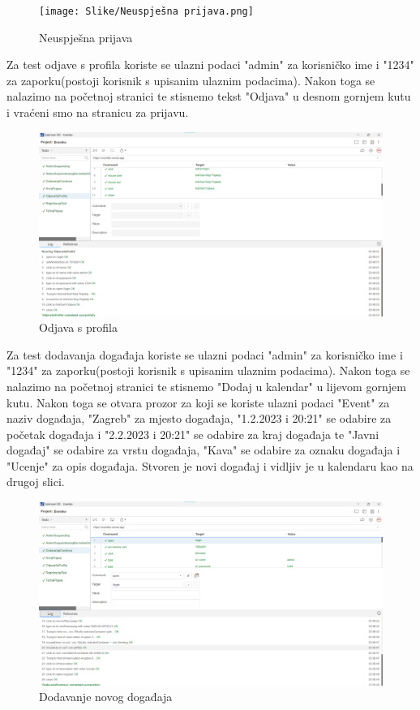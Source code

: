  			\begin{figure}[H]
 				\texttt{[image: Slike/Neuspješna prijava.png]}
 				\caption{Neuspješna prijava}
 			\end{figure}
 		
 			\indent Za test odjave s profila koriste se ulazni podaci "admin" za korisničko ime i "1234" za zaporku(postoji korisnik s upisanim ulaznim podacima). Nakon toga se nalazimo na početnoj stranici te stisnemo tekst "Odjava" u desnom gornjem kutu i vraćeni smo na stranicu za prijavu.
 			
 			\begin{figure}[H]
 				\includegraphics[width=\textwidth]{Slike/OdjavaSProfila.png}
 				\caption{Odjava s profila}
 			\end{figure}
 		
 			\indent Za test dodavanja događaja koriste se ulazni podaci "admin" za korisničko ime i "1234" za zaporku(postoji korisnik s upisanim ulaznim podacima). Nakon toga se nalazimo na početnoj stranici te stisnemo "Dodaj u kalendar" u lijevom gornjem kutu. Nakon toga se otvara prozor za koji se koriste ulazni podaci "Event" za naziv događaja, "Zagreb" za mjesto događaja, "1.2.2023 i 20:21" se odabire za početak događaja i "2.2.2023 i 20:21" se odabire za kraj događaja te "Javni događaj" se odabire za vrstu događaja, "Kava" se odabire za oznaku događaja i "Ucenje" za opis događaja. Stvoren je novi događaj i vidljiv je u kalendaru kao na drugoj slici.
 			\begin{figure}[H]
 				\includegraphics[width=\textwidth]{Slike/DodavanjeEventova.png}
 				\caption{Dodavanje novog događaja}
 			\end{figure}
 		
